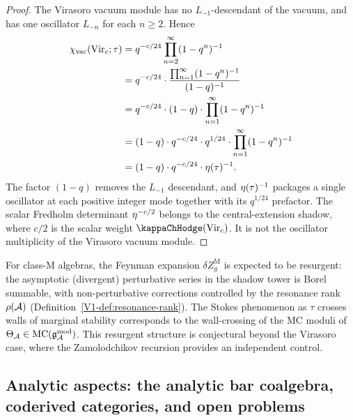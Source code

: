 \begin{proof}
The Virasoro vacuum module has no \(L_{-1}\)-descendant of the vacuum,
and has one oscillator \(L_{-n}\) for each \(n\ge2\). Hence
\begin{align}
\chi_{\mathrm{vac}}(\mathrm{Vir}_c;\tau)
&= q^{-c/24} \prod_{n=2}^{\infty}(1-q^n)^{-1}
\notag\\
&= q^{-c/24}
\cdot \frac{\prod_{n=1}^{\infty}(1-q^n)^{-1}}{(1-q)^{-1}}
\notag\\
&= q^{-c/24}
\cdot (1-q) \cdot \prod_{n=1}^{\infty}(1-q^n)^{-1}
\notag\\
&= (1-q)\cdot q^{-c/24}\cdot q^{1/24}
\cdot \prod_{n=1}^{\infty}(1-q^n)^{-1}
\notag\\
&= (1-q)\cdot q^{-c/24}\cdot \eta(\tau)^{-1}.
\end{align}
The factor $(1-q)$ removes the \(L_{-1}\) descendant, and
\(\eta(\tau)^{-1}\) packages a single oscillator at each positive
integer mode together with its \(q^{1/24}\) prefactor. The scalar
Fredholm determinant \(\eta^{-c/2}\) belongs to the
central-extension shadow, where \(c/2\) is the scalar weight
\(\kappaChHodge(\mathrm{Vir}_c)\). It is not the oscillator
multiplicity of the Virasoro vacuum module.
\end{proof}

\begin{remark}%
%
For class-M algebras, the Feynman expansion
$\delta Z_g^{\mathrm{M}}$ is expected to be resurgent:
the asymptotic (divergent) perturbative series in the shadow
tower is Borel summable, with non-perturbative corrections
controlled by the resonance rank $\rho(\mathcal{A})$
(Definition~\ref{V1-def:resonance-rank}). The Stokes phenomenon
as $\tau$ crosses walls of marginal stability corresponds to
the wall-crossing of the MC moduli of
$\Theta_{\mathcal{A}} \in \mathrm{MC}(\mathfrak{g}_{\mathcal{A}}^{\mathrm{mod}})$. This resurgent structure is
conjectural beyond the Virasoro case, where the Zamolodchikov
recursion provides an independent control.
\end{remark}

%
%

\subsection{Analytic aspects: the analytic bar coalgebra,
coderived categories, and open problems}


